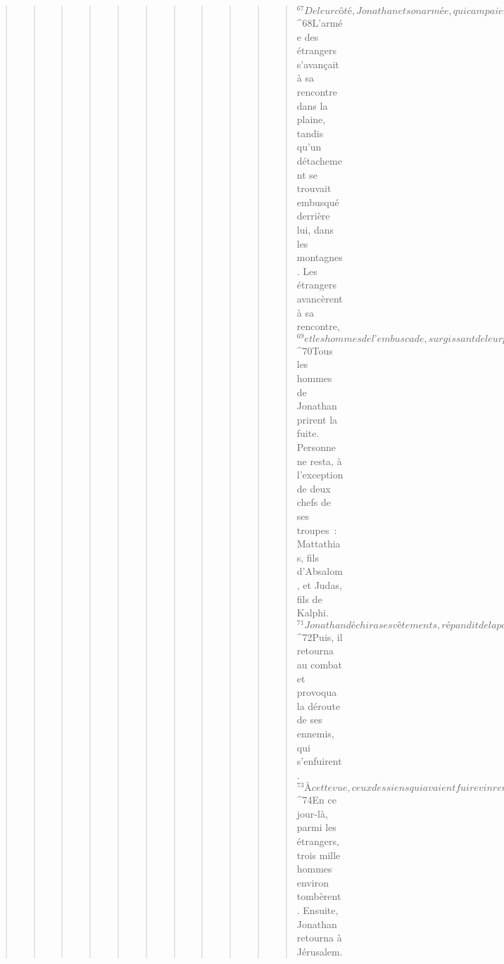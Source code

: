 \begin{verse}
\begin{verse}
\begin{verse}
\begin{verse}
\begin{verse}
\begin{verse}
\begin{verse}
\begin{verse}
\begin{verse}
\begin{verse}
\begin{verse}
${}^{67}De leur côté, Jonathan et son armée, qui campaient près du lac de Gennésar, arrivèrent de grand matin dans la plaine d’Assor. 
${}^{68}L’armée des étrangers s’avançait à sa rencontre dans la plaine, tandis qu’un détachement se trouvait embusqué derrière lui, dans les montagnes. Les étrangers avancèrent à sa rencontre, 
${}^{69}et les hommes de l’embuscade, surgissant de leur position, engagèrent le combat. 
${}^{70}Tous les hommes de Jonathan prirent la fuite. Personne ne resta, à l’exception de deux chefs de ses troupes : Mattathias, fils d’Absalom, et Judas, fils de Kalphi. 
${}^{71}Jonathan déchira ses vêtements, répandit de la poussière sur sa tête et pria. 
${}^{72}Puis, il retourna au combat et provoqua la déroute de ses ennemis, qui s’enfuirent. 
${}^{73}À cette vue, ceux des siens qui avaient fui revinrent auprès de lui. Ensemble, ils poursuivirent les ennemis jusqu’à leur camp, qui se trouvait à Kédès. Eux-mêmes campèrent en ce lieu. 
${}^{74}En ce jour-là, parmi les étrangers, trois mille hommes environ tombèrent. Ensuite, Jonathan retourna à Jérusalem.
      

\end{verse}
\end{verse}
\end{verse}
\end{verse}
\end{verse}
\end{verse}
\end{verse}
\end{verse}
\end{verse}
\end{verse}
\end{verse}
